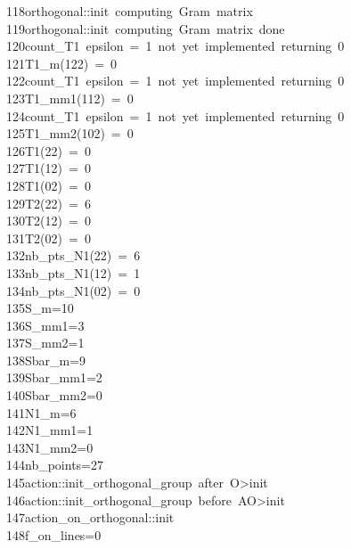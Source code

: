 \begin{tabbing}
118\>orthogonal::init\ computing\ Gram\ matrix\\[0pt]
119\>orthogonal::init\ computing\ Gram\ matrix\ done\\[0pt]
120\>count\_T1\ epsilon\ =\ 1\ not\ yet\ implemented\ returning\ 0\\[0pt]
121\>T1\_m(122)\ =\ 0\\[0pt]
122\>count\_T1\ epsilon\ =\ 1\ not\ yet\ implemented\ returning\ 0\\[0pt]
123\>T1\_mm1(112)\ =\ 0\\[0pt]
124\>count\_T1\ epsilon\ =\ 1\ not\ yet\ implemented\ returning\ 0\\[0pt]
125\>T1\_mm2(102)\ =\ 0\\[0pt]
126\>T1(22)\ =\ 0\\[0pt]
127\>T1(12)\ =\ 0\\[0pt]
128\>T1(02)\ =\ 0\\[0pt]
129\>T2(22)\ =\ 6\\[0pt]
130\>T2(12)\ =\ 0\\[0pt]
131\>T2(02)\ =\ 0\\[0pt]
132\>nb\_pts\_N1(22)\ =\ 6\\[0pt]
133\>nb\_pts\_N1(12)\ =\ 1\\[0pt]
134\>nb\_pts\_N1(02)\ =\ 0\\[0pt]
135\>S\_m=10\\[0pt]
136\>S\_mm1=3\\[0pt]
137\>S\_mm2=1\\[0pt]
138\>Sbar\_m=9\\[0pt]
139\>Sbar\_mm1=2\\[0pt]
140\>Sbar\_mm2=0\\[0pt]
141\>N1\_m=6\\[0pt]
142\>N1\_mm1=1\\[0pt]
143\>N1\_mm2=0\\[0pt]
144\>nb\_points=27\\[0pt]
145\>action::init\_orthogonal\_group\ after\ O>init\\[0pt]
146\>action::init\_orthogonal\_group\ before\ AO>init\\[0pt]
147\>action\_on\_orthogonal::init\\[0pt]
148\>f\_on\_lines=0\\[0pt]

\end{tabbing}
